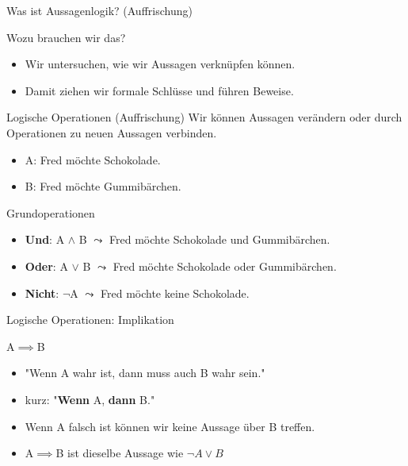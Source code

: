 \documentclass[10pt]{beamer}
\begin{document}
\begin{frame}[fragile]{Was ist Aussagenlogik? (Auffrischung)}
    \begin{alertblock}{Wozu brauchen wir das?}
    \begin{itemize}
        \item Wir untersuchen, wie wir Aussagen verknüpfen können.
        \item Damit ziehen wir formale Schlüsse und führen Beweise.
    \end{itemize}
    \end{alertblock}
\end{frame}

\begin{frame}[fragile]{Logische Operationen (Auffrischung)}
Wir können Aussagen verändern oder durch Operationen zu neuen Aussagen verbinden.
\begin{itemize}
    \item A: Fred möchte Schokolade.
    \item B: Fred möchte Gummibärchen.
\end{itemize}
\begin{alertblock}{Grundoperationen}
\begin{itemize}
    \item<1-> \textbf{Und}: A \alert<1>{$\wedge$} B $\leadsto$ Fred möchte Schokolade \alert<1>{und} Gummibärchen.
    \item<2-> \textbf{Oder}: A \alert<2>{$\vee$} B $\leadsto$ Fred möchte Schokolade \alert<2>{oder} Gummibärchen.\\
    \item<3> \textbf{Nicht}: \alert<3>{$\neg$}A $\leadsto$ Fred möchte \alert<3>{keine} Schokolade.
\end{itemize}
\end{alertblock}
\end{frame}

\begin{frame}{Logische Operationen: Implikation}
\begin{alertblock}{A$\implies$B}
\begin{itemize}
    \item "Wenn A wahr ist, dann muss auch B wahr sein."
    \item kurz: "\textbf{Wenn} A, \textbf{dann} B."
    \item Wenn A falsch ist können wir keine Aussage über B treffen.
    \item A$\implies$B ist dieselbe Aussage wie $\neg A \vee B$
\end{itemize}
\end{alertblock}
\end{frame}
\end{document}
